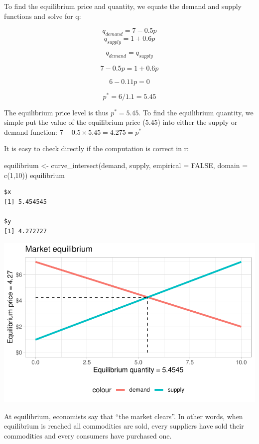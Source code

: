 \documentclass[
  letterpaper,
  DIV=11,
  numbers=noendperiod]{scrreprt}
\newenvironment{Shaded}{\begin{snugshade}}{\end{snugshade}}
\newcommand{\AttributeTok}[1]{\textcolor[rgb]{0.40,0.45,0.13}{#1}}
\newcommand{\ConstantTok}[1]{\textcolor[rgb]{0.56,0.35,0.01}{#1}}
\newcommand{\DecValTok}[1]{\textcolor[rgb]{0.68,0.00,0.00}{#1}}
\newcommand{\FunctionTok}[1]{\textcolor[rgb]{0.28,0.35,0.67}{#1}}
\newcommand{\NormalTok}[1]{\textcolor[rgb]{0.00,0.23,0.31}{#1}}
\newcommand{\OtherTok}[1]{\textcolor[rgb]{0.00,0.23,0.31}{#1}}
\begin{document}
To find the equilibrium price and quantity, we equate the demand and
supply functions and solve for q:

\[
q_{demand} = 7- 0.5p
\] \[
q_{supply} = 1 + 0.6p 
\]

\[
q_{demand} = q_{supply}
\]

\[
7 - 0.5p = 1 + 0.6p
\]

\[
6-0.11p = 0
\]

\[
p^* = 6/1.1 = 5.45
\]

The equilibrium price level is thus \(p^* = 5.45\). To find the
equilibrium quantity, we simple put the value of the equilibrium price
(5.45) into either the supply or demand function:
\(7-0.5 \times 5.45 = 4.275 = p^*\)

It is easy to check directly if the computation is correct in r:

\begin{Shaded}
\begin{Highlighting}[]
\NormalTok{equilibrium }\OtherTok{\textless{}{-}} \FunctionTok{curve\_intersect}\NormalTok{(demand, supply, }\AttributeTok{empirical =} \ConstantTok{FALSE}\NormalTok{, }\AttributeTok{domain =} \FunctionTok{c}\NormalTok{(}\DecValTok{1}\NormalTok{,}\DecValTok{10}\NormalTok{))}
\NormalTok{equilibrium}
\end{Highlighting}
\end{Shaded}

\begin{verbatim}
$x
[1] 5.454545

$y
[1] 4.272727
\end{verbatim}

\includegraphics{intro_files/figure-pdf/unnamed-chunk-5-1.pdf}

At equilibrium, economists say that ``the market clears''. In other
words, when equilibrium is reached all commodities are sold, every
suppliers have sold their commodities and every consumers have purchased
one.
\end{document}
